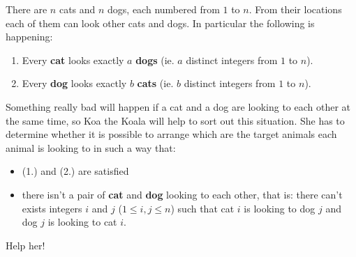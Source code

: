 There are $n$ cats and $n$ dogs, each numbered from $1$ to $n$. From their locations each of them can look other cats and dogs. In particular the following is happening:\\

\begin{enumerate}
  \item Every \textbf{cat} looks exactly $a$ \textbf{dogs} (ie. $a$ distinct integers from $1$ to $n$).
  \item Every \textbf{dog} looks exactly $b$ \textbf{cats} (ie. $b$ distinct integers from $1$ to $n$).
\end{enumerate}

Something really bad will happen if a cat and a dog are looking to each other at the same time, so Koa the Koala will help to sort out this situation. She has to determine whether it is possible to arrange which are the target animals each animal is looking to in such a way that:\\

\begin{itemize}
  \item (1.) and (2.) are satisfied
  \item there isn't a pair of \textbf{cat} and \textbf{dog} looking to each other, that is: there can't exists integers $i$ and $j$ ($1 \le i, j \le n$) such that cat $i$ is looking to dog $j$ and dog $j$ is looking to cat $i$.
\end{itemize}

Help her!


